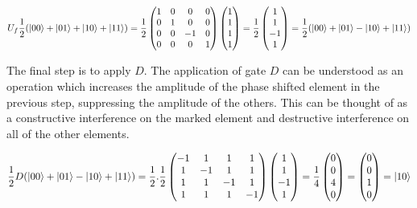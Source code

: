 \begin{align}
        U_f\frac{1}{2}(\left\vert{00}\right\rangle + \left\vert{01}\right\rangle +\left\vert{10}\right\rangle + \left\vert{11}\right\rangle)
        =\frac{1}{2}
        \begin{pmatrix}
        1 & 0 & 0 & 0 \\
        0 & 1 & 0 & 0\\
        0  & 0 & -1 & 0 \\
        0 & 0 & 0 & 1
        \end{pmatrix}
        \begin{pmatrix}
        1\\
        1\\
        1\\
        1\\
        \end{pmatrix}
        =
        \frac{1}{2}
        \begin{pmatrix}
        1\\
        1\\
        -1\\
        1\\
        \end{pmatrix}
        =\frac{1}{2}(\left\vert{00}\right\rangle + \left\vert{01}\right\rangle - \left\vert{10}\right\rangle + \left\vert{11}\right\rangle)
\end{align}

The final step is to apply $D$. The application of gate $D$ can be understood as an operation which increases the amplitude of the phase shifted element in the previous step, suppressing the amplitude of the others. This can be thought of as a constructive interference on the marked element and destructive interference on all of the other elements. 

\begin{align}        
    \frac{1}{2} D (\left\vert{00}\right\rangle + \left\vert{01}\right\rangle - \left\vert{10}\right\rangle + \left\vert{11}\right\rangle)
    =\frac{1}{2}.\frac{1}{2}
    \begin{pmatrix}
    -1 & 1 & 1 & 1\\
    1 & -1 & 1 & 1 \\
    1 & 1 & -1 & 1 \\
    1 & 1 & 1 & -1 \\
    \end{pmatrix}
    \begin{pmatrix}
    1 \\ 1 \\ -1 \\ 1 
    \end{pmatrix}
    =
    \frac{1}{4}
    \begin{pmatrix}
    0 \\ 0 \\ 4 \\ 0
    \end{pmatrix}
    = 
    \begin{pmatrix}
    0 \\ 0 \\ 1 \\ 0
    \end{pmatrix}
    =\left\vert{10}\right\rangle
\end{align}

